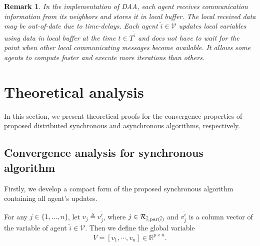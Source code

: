 \documentclass[journal]{IEEEtran}
\newtheorem{remark}{Remark}[section]
\begin{document}
\begin{remark}
	In the implementation of DAA, each agent receives communication information from its neighbors and stores it in local buffer. The local received data may be out-of-date due to time-delays. Each agent $\tilde{i}\in \mathcal{V}$ updates local variables using data in local buffer at the time $t\in T^{\tilde{i}}$ and does not have to wait for the point when other local communicating messages become available. It allows some agents to compute faster and execute more iterations than others.
	
\end{remark}
\section{Theoretical analysis}\label{proof_sec}
In this section, we present theoretical proofs for the convergence properties of proposed distributed synchronous and asynchronous algorithms, respectively.

\subsection{Convergence analysis for synchronous algorithm}
\par Firstly, we  develop a compact form of the proposed synchronous algorithm containing all agent's updates.

For any $j\in\{1,\ldots,n\}$, let $v_j \triangleq v_j^{\tilde i}$, where  $j\in \mathcal{R}_{\tilde{i},{\rm par}(\tilde{i})}$ and $v_j^{\tilde i}$ is a column vector of the variable of agent $\tilde i\in\mathcal V$. Then we define the global variable  
\begin{align}\label{V_def}
V=\left[v_1,\cdots,v_n\right]\in \mathbb{R}^{p \times n}.
\end{align}
\end{document}
